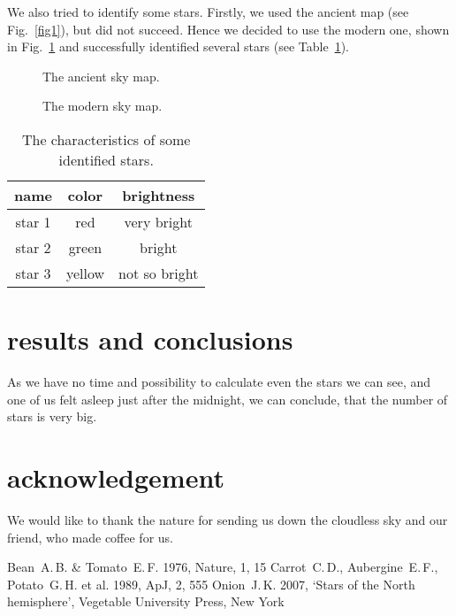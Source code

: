 \documentclass[a4paper]{article}
\renewenvironment{thebibliography}[1]{\begin{oldthebibliography}{#1}\setlength{\parskip}{0ex}\setlength{\itemsep}{0ex}}{\end{oldthebibliography}}
\begin{document}
We also tried to identify some stars. Firstly, we used the ancient map (see Fig.~\ref{fig1}), but did not succeed. Hence we decided to use the modern one, shown in Fig.~\ref{fig2} and successfully identified several stars (see Table~\ref{tab1}).

\begin{figure}[!h]
\centering
\begin{minipage}[t]{.45\linewidth}
\centering
{}
\caption{The ancient sky map.}\label{fig1}
\end{minipage}
\hfill
\begin{minipage}[t]{.45\linewidth}
\centering
{}
\caption{The modern sky map.}\label{fig2}
\end{minipage}
\end{figure}

\begin{table}
 \centering
 \caption{The characteristics of some identified stars.}\label{tab1}
 \vspace*{1ex}
 \begin{tabular}{ccc}
  \hline
  name & color & brightness \\
  \hline
  star 1 & red & very bright \\
  star 2 & green & bright \\
  star 3 & yellow & not so bright\\
 \hline 
 \end{tabular}
\end{table}

\section*{\sc results and conclusions}
\indent \indent As we have no time and possibility to calculate even the stars we can see, and one of us felt asleep just after the midnight, we can conclude, that the number of stars is very big.

\section*{\sc acknowledgement}
\indent \indent We would like to thank the nature for sending us down the cloudless sky and our friend, who made coffee for us.

\begin{thebibliography}{3}
{\small
{} Bean~A.\,B. \& Tomato~E.\,F. 1976, Nature, 1, 15
 Carrot~C.\,D., Aubergine~E.\,F., Potato~G.\,H. et al. 1989, ApJ, 2, 555
 Onion~J.\,K. 2007, `Stars of the North hemisphere', Vegetable University Press, New York
}
\end{thebibliography}
\end{document}
